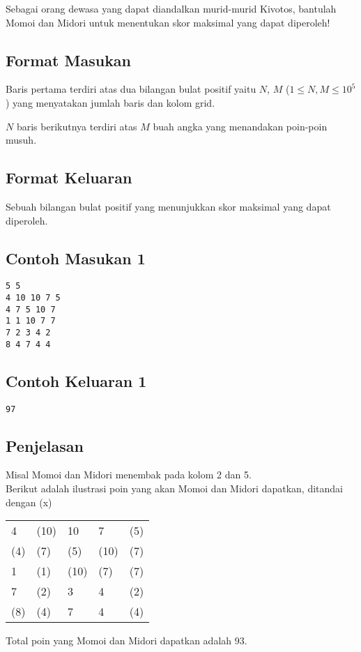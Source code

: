 \documentclass{article}
\begin{document}
Sebagai orang dewasa yang dapat diandalkan murid-murid Kivotos, bantulah Momoi dan Midori untuk menentukan skor maksimal yang dapat diperoleh!

\subsection*{Format Masukan}

Baris pertama terdiri atas dua bilangan bulat positif yaitu $N$, $M$ ($1 \leq N, M \leq 10^5$) yang menyatakan jumlah baris dan kolom grid.

$N$ baris berikutnya terdiri atas $M$ buah angka yang menandakan poin-poin musuh.

\subsection*{Format Keluaran}

Sebuah bilangan bulat positif yang menunjukkan skor maksimal yang dapat diperoleh.

\begin{multicols}{2}
\subsection*{Contoh Masukan 1}
\begin{lstlisting}
5 5
4 10 10 7 5
4 7 5 10 7
1 1 10 7 7
7 2 3 4 2
8 4 7 4 4
\end{lstlisting}
\columnbreak
\subsection*{Contoh Keluaran 1}
\begin{lstlisting}
97
\end{lstlisting}
\vfill
\null
\end{multicols}


\subsection*{Penjelasan}

Misal Momoi dan Midori menembak pada kolom 2 dan 5.\\
Berikut adalah ilustrasi poin yang akan Momoi dan Midori dapatkan, ditandai dengan (x)

\begin{tabular}{lllll}
4   & (10) & 10   & 7    & (5) \\
(4) & (7)  & (5)  & (10) & (7) \\
1   & (1)  & (10) & (7)  & (7) \\
7   & (2)  & 3    & 4    & (2) \\
(8) & (4)  & 7    & 4    & (4)
\end{tabular}

Total poin yang Momoi dan Midori dapatkan adalah 93.
\end{document}

